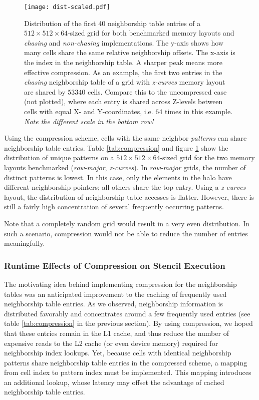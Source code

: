\begin{figure}
	\begin{center}
		\texttt{[image: dist-scaled.pdf]}
		\caption{\label{fig:comp-dist} Distribution of the first 40 neighborship table entries of a $512\times 512\times 64$-sized grid for both benchmarked memory layouts and \emph{chasing} and \emph{non-chasing} implementations. The y-axis shows how many cells share the same relative neighborship offsets. The x-axis is the index in the neighborship table. A sharper peak means more effective compression. As an example, the first two entries in the \emph{chasing} neighborship table of a grid with \emph{z-curves} memory layout are shared by $53340$ cells. Compare this to the uncompressed case (not plotted), where each entry is shared across Z-levels between cells with equal X- and Y-coordinates, i.e. $64$ times in this example. \emph{Note the different scale in the bottom row!}}
	\end{center}
\end{figure}

Using the compression scheme, cells with the same neighbor \emph{patterns} can share neighborship table entries. Table \ref{tab:compression} and figure \ref{fig:comp-dist} show the distribution of unique patterns on a $512\times 512\times 64$-sized grid for the two memory layouts benchmarked (\emph{row-major}, \emph{z-curves}). In \emph{row-major} grids, the number of distinct patterns is lowest. In this case, only the elements in the halo have different neighborship pointers; all others share the top entry. Using a \emph{z-curves} layout, the distribution of neighborship table accesses is flatter. However, there is still a fairly high concentration of several frequently occurring patterns.

Note that a completely random grid would result in a very even distribution. In such a scenario, compression would not be able to reduce the number of entries meaningfully. 

\subsubsection{Runtime Effects of Compression on Stencil Execution} 

The motivating idea behind implementing compression for the neighborship tables was an anticipated improvement to the caching of frequently used neighborship table entries. As we observed, neighborship information is distributed favorably and concentrates around a few frequently used entries (see table \ref{tab:compression} in the previous section). By using compression, we hoped that these entries remain in the L1 cache, and thus reduce the number of expensive reads to the L2 cache (or even device memory) required for neighborship index lookups. Yet, because cells with identical neighborship patterns share neighborship table entries in the compressed scheme, a mapping from cell index to pattern index must be implemented. This mapping introduces an additional lookup, whose latency may offset the advantage of cached neighborship table entries.

